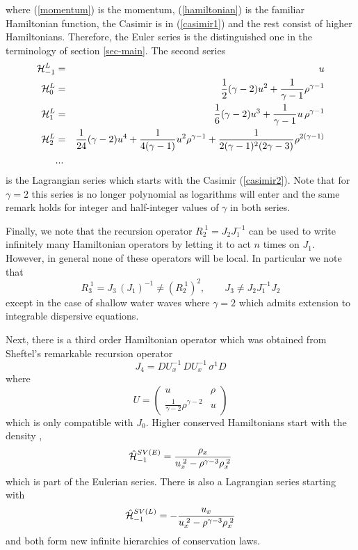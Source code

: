 \documentclass[a4paper,12pt]{article}
\begin{document}
where (\ref{momentum}) is the momentum, (\ref{hamiltonian})  is
the familiar Hamiltonian function, the Casimir is in
(\ref{casimir1}) and the rest consist of higher Hamiltonians.
Therefore, the Euler series is the distinguished one in the
terminology of section \ref{sec-main}. The second series
\begin{eqnarray}
{\cal H}_{-1}^L &=& u \label{casimir2} \\
{\cal H}_{0}^L &=& \frac{1}{2} (\gamma-2) u^{2}
  +\frac{1}{\gamma -1} \rho^{\gamma-1} \label{h1l} \\
{\cal H}_{1}^L &=& \frac{1}{6} (\gamma-2) u^{3}
+ \frac{1}{\gamma-1} u\, \rho ^{\gamma-1} \label{h2l}\\
{\cal H}_{2}^L &=& \frac{1}{24} (\gamma-2) u^{4} +\frac{1}{4
(\gamma -1)} u^2  \rho^{\gamma -1}
+\frac{1}{2 (\gamma -1)^2 (2 \gamma - 3) } \rho^{2 (\gamma -1)} \label{h3l}\\
& ... &  \nonumber
\end{eqnarray}
is the Lagrangian series which starts with the Casimir
(\ref{casimir2}). Note that for $\gamma=2$ this series is no
longer polynomial as logarithms will enter and the same remark
holds for integer and half-integer values of $\gamma$ in both
series.

Finally, we note that the recursion operator $R_{2}^{\;1} = J_2
J_1^{-1}$ can be used to write infinitely many Hamiltonian
operators by letting it to act $n$ times on $ J_1 $. However, in
general none of these operators will be local. In particular we
note that
\begin{equation}
R_{3}^{\;1} = J_3 \, (J_1)^{-1} \ne ( R_{2}^{\;1})^2, \qquad J_3
\ne J_2 J_1^{-1} J_2
\end{equation}
except in the case of shallow water waves where $\gamma=2$ which
admits extension to integrable dispersive equations.

Next, there is a third order Hamiltonian operator \cite{on} which
was obtained from Sheftel's remarkable recursion operator
\cite{sheftel}
\begin{equation}
J_4 = D U_x^{-1} \, D U_x^{-1} \, \sigma^1 D
\label{sheftel}
\end{equation}
where
\begin{equation}
U = \left( \begin{array}{cc} u &  \rho \\
    \frac{1}{\gamma-2}  \rho^{\gamma-2}  & u \end{array} \right)
\label{sheftelu}
\end{equation}
which is only compatible with $J_0$. Higher conserved Hamiltonians
start with the density \cite{sheftel}, \cite{verosky}
\begin{equation}
\hat {\cal H}^{SV(E)}_{-1} = \frac{\rho_x}{ u_x^{\;2} -
\rho^{\gamma - 3} \rho_x^{\;2}} \label{verosky}
\end{equation}
which is part of the Eulerian series. There is also a Lagrangian
series starting with
\begin{equation}
\hat {\cal H}^{SV(L)}_{-1} = - \frac{u_x}{ u_x^{\;2} -
\rho^{\gamma - 3} \rho_x^{\;2}} \label{verosky2}
\end{equation}
and both form new infinite hierarchies of conservation laws.
\end{document}
